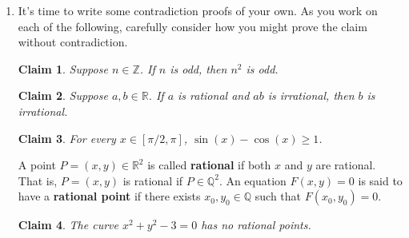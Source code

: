 \documentclass[12 pt]{article}
\newcommand{\R}{\mathbb{R}}
\newcommand{\Z}{\mathbb{Z}}
\theoremstyle{definition}
\theoremstyle{plain}
\theoremstyle{mytheorem}
\newtheorem{claim}{Claim}
\theoremstyle{myexample}
\theoremstyle{mydefinition}
\begin{document}
\begin{enumerate}
\item It's time to write some contradiction proofs of your own.  As you work on each of the following, carefully consider how you might prove the claim without contradiction.  

\begin{claim}  Suppose $n \in \Z$.  If $n$ is odd, then $n^2$ is odd.
\end{claim}
\vspace{2in}
\begin{claim}  Suppose $a,b \in \R$.  If $a$ is rational and $ab$ is irrational, then $b$ is irrational.
\end{claim}
\vspace{3in}
\begin{claim}  For every $x \in [\pi/2,\pi]$, $\sin(x)-\cos(x) \geq 1$.
\end{claim}
\vspace{4in}
A point $P=(x,y) \in \R^2$ is called \textbf{rational} if both $x$ and $y$ are rational.  That is, $P=(x,y)$ is rational if $P \in \mathbb{Q}^2$.  An equation $F(x,y)=0$ is said to have a \textbf{rational point} if there exists $x_0,y_0 \in \mathbb{Q}$ such that $F(x_0,y_0)=0$.  
\begin{claim}  The curve $x^2+y^2-3=0$ has no rational points.
\end{claim}
\end{enumerate}
\end{document}
